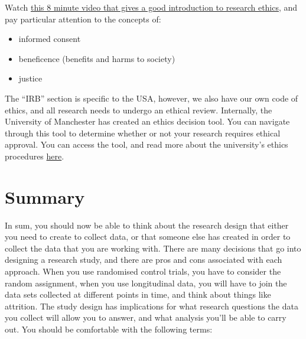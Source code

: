 \documentclass[
]{book}
\providecommand{\tightlist}{%
  \setlength{\itemsep}{0pt}\setlength{\parskip}{0pt}}
\begin{document}
Watch \href{https://www.youtube.com/watch?v=nX4c3V23DZI}{this 8 minute video that gives a good introduction to research ethics}, and pay particular attention to the concepts of:

\begin{itemize}
\tightlist
\item
  informed consent
\item
  beneficence (benefits and harms to society)
\item
  justice
\end{itemize}

The ``IRB'' section is specific to the USA, however, we also have our own code of ethics, and all research needs to undergo an ethical review. Internally, the University of Manchester has created an ethics decision tool. You can navigate through this tool to determine whether or not your research requires ethical approval. You can access the tool, and read more about the university's ethics procedures \href{https://www.manchester.ac.uk/research/environment/governance/ethics/}{here}.

\hypertarget{summary-4}{%
\section{Summary}\label{summary-4}}

In sum, you should now be able to think about the research design that either you need to create to collect data, or that someone else has created in order to collect the data that you are working with. There are many decisions that go into designing a research study, and there are pros and cons associated with each approach. When you use randomised control trials, you have to consider the random assignment, when you use longitudinal data, you will have to join the data sets collected at different points in time, and think about things like attrition. The study design has implications for what research questions the data you collect will allow you to answer, and what analysis you'll be able to carry out. You should be comfortable with the following terms:
\end{document}
